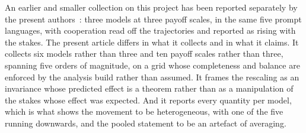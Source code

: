 \documentclass[11pt,a4paper]{article}
\begin{document}
An earlier and smaller collection on this project has been reported separately
by the present authors~\citep{selfpreprint2026scaling}: three models at three
payoff scales, in the same five prompt languages, with cooperation read off the
trajectories and reported as rising with the stakes. The present article differs
in what it collects and in what it claims. It collects six models rather than
three and ten payoff scales rather than three, spanning five orders of
magnitude, on a grid whose completeness and balance are enforced by the analysis
build rather than assumed. It frames the rescaling as an invariance whose
predicted effect is a theorem rather than as a manipulation of the stakes whose
effect was expected. And it reports every quantity per model, which is what
shows the movement to be heterogeneous, with one of the five running downwards,
and the pooled statement to be an artefact of averaging.

%
\end{document}
